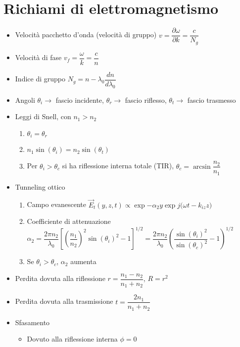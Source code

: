 \documentclass{article}
\begin{document}
\section{Richiami di elettromagnetismo}
\begin{itemize}
  \item Velocità pacchetto d'onda (velocità di gruppo) \( v = \dfrac{\partial \omega}{\partial k} = \dfrac{c}{N_g} \)
  \item Velocità di fase \( v_f = \dfrac{\omega}{k} = \dfrac{c}{n}  \)
  \item Indice di gruppo \( N_g = n - \lambda_0 \dfrac{dn}{d\lambda_0} \)
  \item Angoli \( \theta_i \rightarrow \) fascio incidente, \( \theta_r \rightarrow \) fascio riflesso, \( \theta_t \rightarrow \) fascio trasmesso
  \item Leggi di Snell, con \( n_1 > n_2 \)
        \begin{enumerate}
          \item \( \theta_i = \theta_r \)
          \item \( n_1 \sin(\theta_i) = n_2 \sin(\theta_t) \)
          \item Per \( \theta_i > \theta_c \) si ha riflessione interna totale (TIR), \( \theta_c = \arcsin\dfrac{n_2}{n_1} \)
        \end{enumerate}
  \item Tunneling ottico
        \begin{enumerate}
          \item Campo evanescente \( \vec{E}_t(y, z, t) \propto \exp{-\alpha_2 y} \exp{j (\omega t - k_{iz} z}) \)
          \item Coefficiente di attenuazione \( \alpha_2 = \dfrac{2 \pi n_2}{\lambda_0} \left[\left(\dfrac{n_1}{n_2}\right)^2 \sin(\theta_i)^2 - 1\right] ^ {1/2} = \dfrac{2 \pi n_2}{\lambda_0} \left(\dfrac{\sin(\theta_i)^2}{\sin(\theta_c)^2} - 1 \right) ^ {1/2} \)
          \item Se \( \theta_i > \theta_c\), \(\alpha_2 \) aumenta
        \end{enumerate}
  \item Perdita dovuta alla riflessione \( r = \dfrac{n_1-n_2}{n_1+n_2} \), \( R = r^2 \)
  \item Perdita dovuta alla trasmissione \( t = \dfrac{2n_1}{n_1 + n_2} \)
  \item Sfasamento
        \begin{itemize}
          \item Dovuto alla riflessione interna \( \phi = 0 \)

\end{itemize}
\end{itemize}
\end{document}
